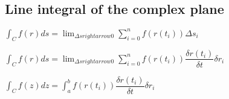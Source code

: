 
\subsection{Line integral of the complex plane}

\(\int_C f(r) ds=\lim_{\Delta s rightarrow 0 }\sum_{i=0}^n f(r(t_i))\Delta s_i\)

\(\int_C f(r) ds=\lim_{\Delta s rightarrow 0 }\sum_{i=0}^n f(r(t_i))\dfrac{\delta r(t_i)}{\delta t}\delta r_i\)

\(\int_C f(z) dz=\int_a^b f(r(t_i))\dfrac{\delta r(t_i)}{\delta t}\delta r_i\)

